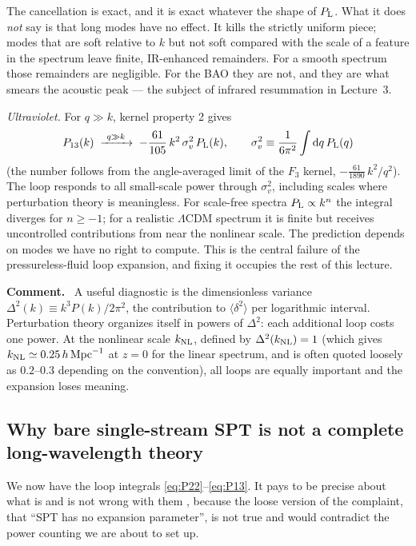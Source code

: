 \documentclass[a4paper,11pt]{article}
\def\Plin{P_{\rm L}}
\def\knl{k_{\rm NL}}
\newcommand{\dd}{\mathrm{d}}
\def\lcdm{$\Lambda$CDM}
\numberwithin{equation}{section}
\newenvironment{remark}
  {\par\medskip\noindent\begingroup\small\color{ForestGreen!60!black}\textbf{Comment.}\ }
  {\endgroup\par\medskip}
\begin{document}
The cancellation is exact, and it is exact whatever the shape of $\Plin$. What it does \emph{not} say is that long modes have no effect. It kills the strictly uniform piece; modes that are soft relative to $k$ but not soft compared with the scale of a feature in the spectrum leave finite, IR-enhanced remainders. For a smooth spectrum those remainders are negligible. For the BAO they are not, and they are what smears the acoustic peak --- the subject of infrared resummation in Lecture~3.

\emph{Ultraviolet.} For $q \gg k$, kernel property 2 gives
\begin{equation}
P_{13}(k) \;\xrightarrow{\ q\gg k\ }\; -\frac{61}{105}\,k^2\,\sigma_v^2\,\Plin(k) ,
\qquad
\sigma_v^2 \equiv \frac{1}{6\pi^2}\int \dd q\,\Plin(q)
\label{eq:P13_UV}
\end{equation}
(the number follows from the angle-averaged limit of the $F_3$ kernel, $-\tfrac{61}{1890}\,k^2/q^2$). The loop responds to all small-scale power through $\sigma_v^2$, including scales where perturbation theory is meaningless. For scale-free spectra $\Plin\propto k^n$ the integral diverges for $n \ge -1$; for a realistic \lcdm{} spectrum it is finite but receives uncontrolled contributions from near the nonlinear scale. The prediction depends on modes we have no right to compute. This is the central failure of the pressureless-fluid loop expansion, and fixing it occupies the rest of this lecture.

\begin{remark}
A useful diagnostic is the dimensionless variance $\Delta^2(k) \equiv k^3P(k)/2\pi^2$, the contribution to $\langle\delta^2\rangle$ per logarithmic interval. Perturbation theory organizes itself in powers of $\Delta^2$: each additional loop costs one power. At the nonlinear scale $\knl$, defined by $\Delta^2(\knl)=1$ (which gives $\knl \simeq 0.25\,h\,{\rm Mpc}^{-1}$ at $z=0$ for the linear spectrum, and is often quoted loosely as $0.2$--$0.3$ depending on the convention), all loops are equally important and the expansion loses meaning.
\end{remark}

\subsection{Why bare single-stream SPT is not a complete long-wavelength theory}
\label{sec:sptfails}

We now have the loop integrals \eqref{eq:P22}--\eqref{eq:P13}. It pays to be precise about what is and is not wrong with them \cite{BaumannCargese,Baumann2010,Carroll2013}, because the loose version of the complaint, that ``SPT has no expansion parameter'', is not true and would contradict the power counting we are about to set up.
\end{document}
